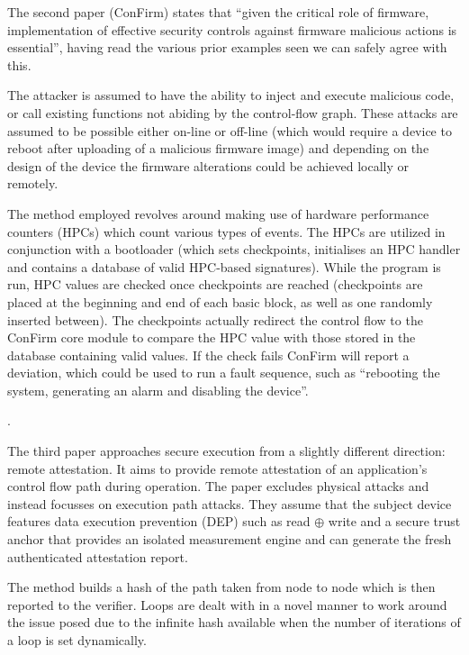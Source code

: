 
The second paper \cite{Wang2016} (ConFirm) states that ``given the critical role of firmware, implementation of effective security controls against firmware malicious actions is essential'', having read the various prior examples seen we can safely agree with this. 

The attacker is assumed to have the ability to inject and execute malicious code, or call existing functions not abiding by the control-flow graph. These attacks are assumed to be possible either on-line or off-line (which would require a device to reboot after uploading of a malicious firmware image) and depending on the design of the device the firmware alterations could be achieved locally or remotely.

The method employed revolves around making use of hardware performance counters (HPCs) which count various types of events. The HPCs are utilized in conjunction with a bootloader (which sets checkpoints, initialises an HPC handler and contains a database of valid HPC-based signatures). While the program is run, HPC values are checked once checkpoints are reached (checkpoints are placed at the beginning and end of each basic block, as well as one randomly inserted between). The checkpoints actually redirect the control flow to the ConFirm core module to compare the HPC value with those stored in the database containing valid values. If the check fails ConFirm will report a deviation, which could be used to run a fault sequence, such as ``rebooting the system, generating an alarm and disabling the device''.

\ifnotesincluded
{}.
\fi

The third paper \cite{Abera2016} approaches secure execution from a slightly different direction: remote attestation. It aims to provide remote attestation of an application's control flow path during operation. The paper excludes physical attacks and instead focusses on execution path attacks. They assume that the subject device features data execution prevention (DEP) such as read $\oplus$ write and a secure trust anchor that provides an isolated measurement engine and can generate the fresh authenticated attestation report.

The method builds a hash of the path taken from node to node which is then reported to the verifier. Loops are dealt with in a novel manner to work around the issue posed due to the infinite hash available when the number of iterations of a loop is set dynamically.

